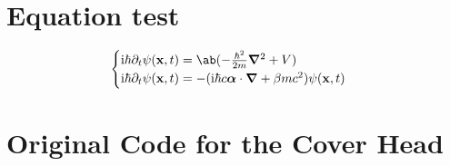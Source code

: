\documentclass[mtpro2,twoside,openany]{litesolution}
\begin{document}
\section{Equation test}

\[\begin{cases}
    \i\hbar\partial_t\psi(\mathbf x,t)=\ab(-\frac{\hbar^2}{2m}\bm\nabla^2+V)\\
    \i\hbar\partial_t\psi(\mathbf x,t)=-(\i\hbar c\bm\alpha\cdot\bm\nabla+\beta mc^2)\psi(\mathbf x,t)
\end{cases}\]

\section*{Original Code for the Cover Head}


\end{document}
